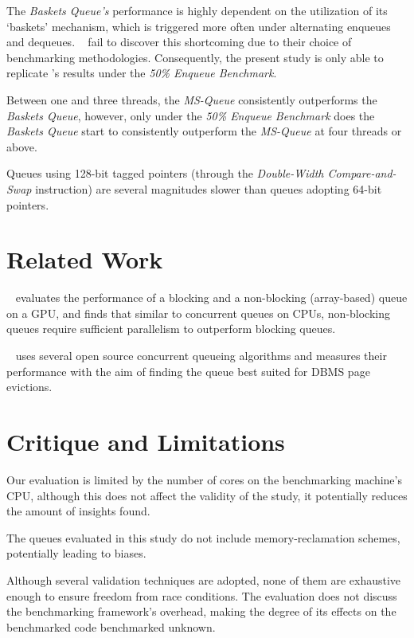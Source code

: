 The \emph{Baskets Queue's} performance is highly dependent on the
utilization of its `baskets' mechanism, which is triggered more often under
alternating enqueues and dequeues. \citeauthor{hoffman2007baskets}~\citep{hoffman2007baskets} fail to
discover this shortcoming due to their choice of benchmarking methodologies.
Consequently, the present study is only able to replicate
\citeauthor{hoffman2007baskets}'s results under the \emph{50\% Enqueue
Benchmark}.

Between one and three threads, the \emph{MS-Queue} consistently outperforms the
\emph{Baskets Queue}, however, only under the \emph{50\% Enqueue Benchmark} does the
\emph{Baskets Queue} start to consistently outperform the \emph{MS-Queue}
at four threads or above.

Queues using 128-bit tagged pointers (through the \emph{Double-Width
Compare-and-Swap} instruction) are several magnitudes slower than queues
adopting 64-bit pointers.

\section{Related Work}
\citeauthor{pourmeidani2019performance}~\citep{pourmeidani2019performance} evaluates the performance of a blocking
and a non-blocking (array-based) queue on a GPU, and finds that similar to
concurrent queues on CPUs, non-blocking queues require sufficient parallelism
to outperform blocking queues.

\citeauthor{gilbert2020performance}~\citep{gilbert2020performance}
uses several open source concurrent queueing algorithms and measures
their performance with the aim of finding the queue best suited for DBMS page
evictions.

\section{Critique and Limitations}
Our evaluation is limited by the number of cores on the benchmarking
machine's CPU, although this does not affect the validity of the study, it
potentially reduces the amount of insights found.

The queues evaluated in this study do not include memory-reclamation schemes,
potentially leading to biases.

Although several validation techniques are adopted, none of them are exhaustive
enough to ensure freedom from race conditions. The evaluation does not
discuss the benchmarking framework's overhead, making the degree of its effects
on the benchmarked code benchmarked unknown.

